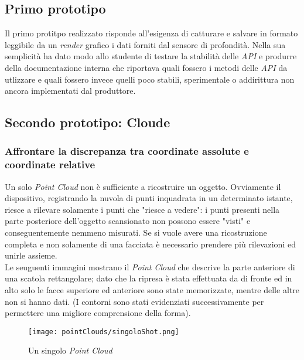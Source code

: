 \subsection{Primo prototipo}
Il primo protitpo realizzato risponde all'esigenza di catturare e salvare in formato leggibile da un \emph{render} grafico i dati forniti dal sensore di profondità.
Nella sua semplicità ha dato modo allo studente di testare la stabilità delle \emph{API} e produrre della documentazione interna che riportava quali fossero i metodi delle \emph{API} da utlizzare e quali fossero invece quelli poco stabili, sperimentale o addirittura non ancora implementati dal produttore.

\subsection{Secondo prototipo: Cloude}
\subsubsection{Affrontare la discrepanza tra coordinate assolute e coordinate relative}
Un solo \emph{Point Cloud} non è sufficiente a ricostruire un oggetto. Ovviamente il dispositivo, registrando la nuvola di punti inquadrata in un determinato istante, riesce a rilevare solamente i punti che "riesce a vedere": i punti presenti nella parte posteriore dell'oggetto scansionato non possono essere "visti" e conseguentemente nemmeno misurati. Se si vuole avere una ricostruzione completa e non solamente di una facciata è necessario prendere più rilevazioni ed unirle assieme.\\
Le seuguenti immagini mostrano il \emph{Point Cloud} che descrive la parte anteriore di una scatola rettangolare; dato che la ripresa è stata effettuata da di fronte ed in alto solo le facce superiore ed anteriore sono state memorizzate, mentre delle altre non si hanno dati. (I contorni sono stati evidenziati successivamente per permettere una migliore comprensione della forma).
\begin{figure}[!h] 
    \centering 
    \texttt{[image: pointClouds/singoloShot.png]} 
    \caption{Un singolo \emph{Point Cloud}}
\end{figure}
